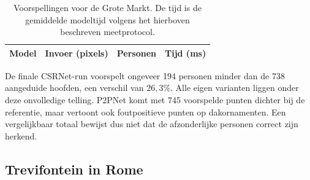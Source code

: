 \begin{table}[H]
    \centering
    \small
    \begin{tabular}{lrrr}
        \toprule
        \textbf{Model} & \textbf{Invoer (pixels)} & \textbf{Personen} & \textbf{Tijd (ms)} \\
        \midrule
        
    \end{tabular}
    \caption[Modelvoorspellingen voor de Grote Markt]{Voorspellingen voor de Grote Markt. De tijd is de gemiddelde modeltijd volgens het hierboven beschreven meetprotocol.}
    \label{tab:grote-markt-modellen}
\end{table}

De finale CSRNet-run voorspelt ongeveer 194 personen minder dan de 738 aangeduide hoofden, een verschil van \(26{,}3\%\). Alle eigen varianten liggen onder deze onvolledige telling. P2PNet komt met 745 voorspelde punten dichter bij de referentie, maar vertoont ook foutpositieve punten op dakornamenten. Een vergelijkbaar totaal bewijst dus niet dat de afzonderlijke personen correct zijn herkend.

\clearpage
\subsection{Trevifontein in Rome}

